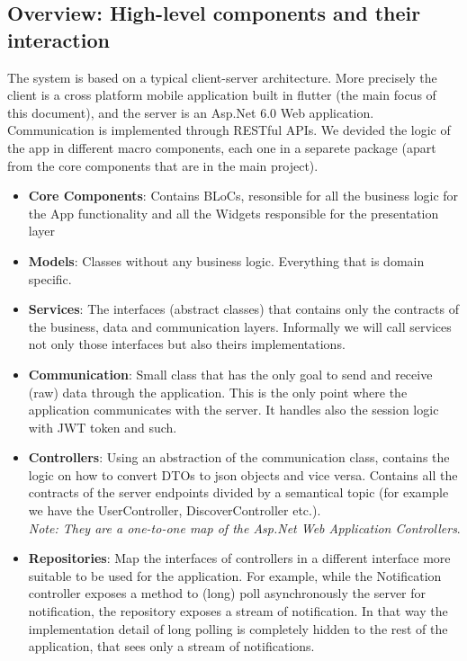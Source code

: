 \documentclass{article}
\begin{document}
\subsection{Overview: High-level components and their interaction}
\label{sec:overview}
The system is based on a typical client-server architecture. More precisely the client is a cross platform mobile application built in flutter (the main focus of this document), and the server is an Asp.Net 6.0 Web application. Communication is implemented through RESTful APIs. We devided the logic of the app in different macro components, each one in a separete package (apart from the core components that are in the main project).
\begin{itemize}
	\item \textbf{Core Components}: Contains BLoCs, resonsible for all the business logic for the App functionality and all the Widgets responsible for the presentation layer
    \item \textbf{Models}: Classes without any business logic. Everything that is domain specific.
    \item \textbf{Services}: The interfaces (abstract classes) that contains only the contracts of the business, data and communication layers. Informally we will call services not only those interfaces but also theirs implementations. 
    \item \textbf{Communication}: Small class that has the only goal to send and receive (raw) data through the application. This is the only point where the application communicates with the server. It handles also the session logic with JWT token and such.
    \item \textbf{Controllers}: Using an abstraction of the communication class, contains the logic on how to convert DTOs to json objects and vice versa. Contains all the contracts of the server endpoints divided by a semantical topic (for example we have the UserController, DiscoverController etc.). \\ \textit{Note: They are a one-to-one map of the Asp.Net Web Application Controllers}.
    \item \textbf{Repositories}: Map the interfaces of controllers in a different interface more suitable to be used for the application. For example, while the Notification controller exposes a method to (long) poll asynchronously the server for notification, the repository exposes a stream of notification. In that way the implementation detail of long polling is completely hidden to the rest of the application, that sees only a stream of notifications.
\end{itemize}
\end{document}
